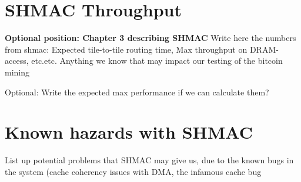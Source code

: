 
\section{SHMAC Throughput}
\textbf{Optional position: Chapter 3 describing SHMAC}
Write here the numbers from shmac: Expected tile-to-tile routing time, Max throughput on DRAM-access, etc.etc. Anything we know that may impact our testing of the bitcoin mining

Optional: Write the expected max performance if we can calculate them?

\section{Known hazards with SHMAC}
List up potential problems that SHMAC may give us, due to the known bugs in the system (cache coherency issues with DMA, the infamous cache bug



%



